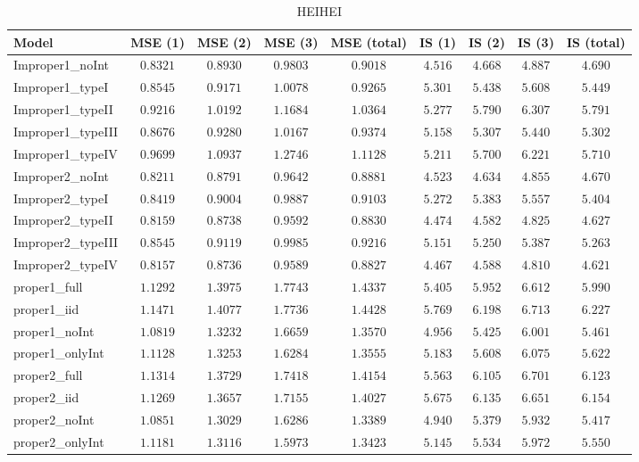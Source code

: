 \begin{table}

\caption{\label{tab:model-choice-sc1}HEIHEI}
\centering
\begin{tabular}{lcccccccc}
\hline
Model  & MSE (1) & MSE (2) & MSE (3) & MSE (total) & IS (1) & IS (2) & IS (3) & \multicolumn{1}{c}{IS (total)} \\ 
\hline
Improper1_noInt  & $0.8321$ & $0.8930$ & $0.9803$ & $0.9018$ & $4.516$ & $4.668$ & $4.887$ & $4.690$ \\
Improper1_typeI  & $0.8545$ & $0.9171$ & $1.0078$ & $0.9265$ & $5.301$ & $5.438$ & $5.608$ & $5.449$ \\
Improper1_typeII  & $0.9216$ & $1.0192$ & $1.1684$ & $1.0364$ & $5.277$ & $5.790$ & $6.307$ & $5.791$ \\
Improper1_typeIII  & $0.8676$ & $0.9280$ & $1.0167$ & $0.9374$ & $5.158$ & $5.307$ & $5.440$ & $5.302$ \\
Improper1_typeIV  & $0.9699$ & $1.0937$ & $1.2746$ & $1.1128$ & $5.211$ & $5.700$ & $6.221$ & $5.710$ \\
Improper2_noInt  & $0.8211$ & $0.8791$ & $0.9642$ & $0.8881$ & $4.523$ & $4.634$ & $4.855$ & $4.670$ \\
Improper2_typeI  & $0.8419$ & $0.9004$ & $0.9887$ & $0.9103$ & $5.272$ & $5.383$ & $5.557$ & $5.404$ \\
Improper2_typeII  & $0.8159$ & $0.8738$ & $0.9592$ & $0.8830$ & $4.474$ & $4.582$ & $4.825$ & $4.627$ \\
Improper2_typeIII  & $0.8545$ & $0.9119$ & $0.9985$ & $0.9216$ & $5.151$ & $5.250$ & $5.387$ & $5.263$ \\
Improper2_typeIV  & $0.8157$ & $0.8736$ & $0.9589$ & $0.8827$ & $4.467$ & $4.588$ & $4.810$ & $4.621$ \\
proper1_full  & $1.1292$ & $1.3975$ & $1.7743$ & $1.4337$ & $5.405$ & $5.952$ & $6.612$ & $5.990$ \\
proper1_iid  & $1.1471$ & $1.4077$ & $1.7736$ & $1.4428$ & $5.769$ & $6.198$ & $6.713$ & $6.227$ \\
proper1_noInt  & $1.0819$ & $1.3232$ & $1.6659$ & $1.3570$ & $4.956$ & $5.425$ & $6.001$ & $5.461$ \\
proper1_onlyInt  & $1.1128$ & $1.3253$ & $1.6284$ & $1.3555$ & $5.183$ & $5.608$ & $6.075$ & $5.622$ \\
proper2_full  & $1.1314$ & $1.3729$ & $1.7418$ & $1.4154$ & $5.563$ & $6.105$ & $6.701$ & $6.123$ \\
proper2_iid  & $1.1269$ & $1.3657$ & $1.7155$ & $1.4027$ & $5.675$ & $6.135$ & $6.651$ & $6.154$ \\
proper2_noInt  & $1.0851$ & $1.3029$ & $1.6286$ & $1.3389$ & $4.940$ & $5.379$ & $5.932$ & $5.417$ \\
proper2_onlyInt  & $1.1181$ & $1.3116$ & $1.5973$ & $1.3423$ & $5.145$ & $5.534$ & $5.972$ & $5.550$ \\
\hline 
\end{tabular}


\end{table}
